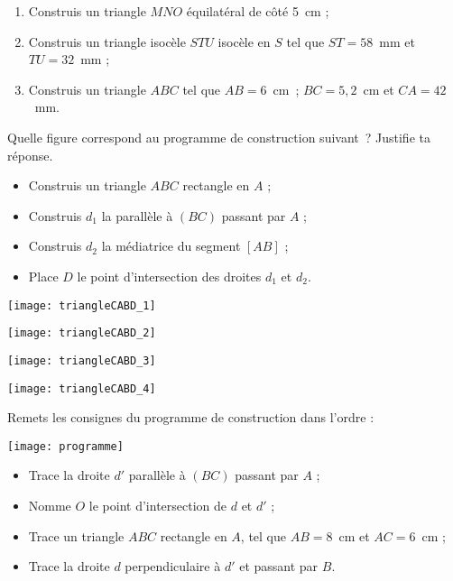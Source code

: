 \begin{exercice}
 \begin{enumerate}
  \item Construis un triangle $MNO$ équilatéral de côté 5 cm ;
  \item Construis un triangle isocèle $STU$ isocèle en $S$ tel que $ST = 58$ mm et $TU = 32$ mm ;
  \item Construis un triangle $ABC$ tel que $AB = 6$ cm ; $BC = 5,2$ cm et $CA = 42$ mm.
  \end{enumerate}
\end{exercice}

\newpage

\begin{exercice}
Quelle figure correspond au programme de construction suivant ? Justifie ta réponse.
 \begin{itemize}
  \item Construis un triangle $ABC$ rectangle en $A$ ;
  \item Construis $d_1$ la parallèle à $(BC)$ passant par $A$ ;
  \item Construis $d_2$ la médiatrice du segment $[AB]$ ;
  \item Place $D$ le point d'intersection des droites $d_1$ et $d_2$.
  \end{itemize}
  \begin{colenumerate}{2}
   \item \texttt{[image: triangleCABD\_1]}
   \item \texttt{[image: triangleCABD\_2]}   
   \item \texttt{[image: triangleCABD\_3]}
   \item \texttt{[image: triangleCABD\_4]}
   \end{colenumerate}
\end{exercice}


\begin{exercice}
Remets les consignes du programme de construction dans l'ordre :
\begin{center} \texttt{[image: programme]} \end{center}
 \begin{itemize}
  \item Trace la droite $d'$ parallèle à $(BC)$ passant par $A$ ;
  \item Nomme $O$ le point d'intersection de $d$ et $d'$ ;
  \item Trace un triangle $ABC$ rectangle en $A$, tel que $AB = 8$ cm et $AC = 6$ cm ;
  \item Trace la droite $d$ perpendiculaire à $d'$ et passant par $B$.
  \end{itemize}
\end{exercice}


